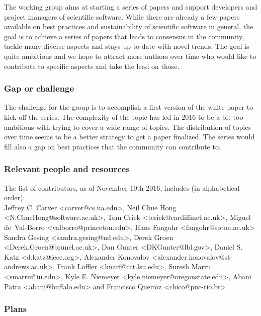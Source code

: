 
The working group aims at starting a series of papers and support developers and project managers of scientific software. While there are already a few papers available on best practices and sustainability of scientific software in general, the goal is to achieve a series of papers that leads to consensus in the community, tackle many diverse aspects and stays up-to-date with novel trends. The goal is quite ambitious and we hope to attract more authors over time who would like to contribute to specific aspects and take the lead on those. 

\subsubsection{Gap or challenge}

The challenge for the group is to accomplish a first version of the white paper to kick off the series. The complexity of the topic has led in 2016 to be a bit too ambitious with trying to cover a wide range of topics. The distribution of topics over time seems to be a better strategy to get a paper finalized. The series would fill also a gap on best practices that the community can contribute to.

\subsubsection{Relevant people and resources}

The list of contributors, as of November 10th 2016, includes (in alphabetical order): \\
Jeffrey C. Carver <carver@cs.ua.edu>,
Neil Chue Hong <N.ChueHong@software.ac.uk>,
Tom Crick <tcrick@cardiffmet.ac.uk>,
Miguel de~Val-Borro <valborro@princeton.edu>,
Hans Fangohr <fangohr@soton.ac.uk>
Sandra Gesing <sandra.gesing@nd.edu>,
Derek Groen <Derek.Groen@brunel.ac.uk>,
Dan Gunter <DKGunter@lbl.gov>,
Daniel S. Katz <d.katz@ieee.org>,
Alexander Konovalov <alexander.konovalov@st-andrews.ac.uk>,
Frank L\"offler <knarf@cct.lsu.edu>,
Suresh Marru <smarru@iu.edu>,
Kyle E. Niemeyer <kyle.niemeyer@oregonstate.edu>,
Abani Patra <abani@buffalo.edu>
and
Francisco Queiroz <chico@puc-rio.br>

\subsubsection{Plans}


